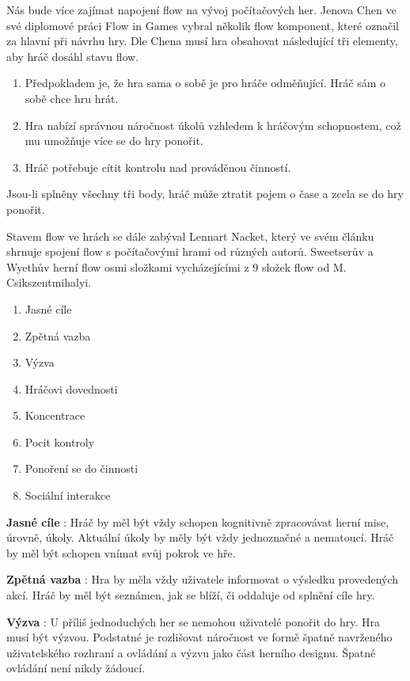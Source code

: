 Nás bude více zajímat napojení flow na vývoj počítačových her. Jenova Chen ve své diplomové práci Flow in Games\cite{thesisflow} vybral několik flow komponent, které označil za hlavní při návrhu hry. Dle Chena musí hra obsahovat následující tři elementy, aby hráč dosáhl stavu flow.

\begin{enumerate}
	\item Předpokladem je, že hra sama o sobě je pro hráče odměňující. Hráč sám o sobě chce hru hrát.
	\item Hra nabízí správnou náročnost úkolů vzhledem k hráčovým schopnostem, což mu umožňuje více se do hry ponořit.
	\item Hráč potřebuje cítit kontrolu nad prováděnou činností.
\end{enumerate}

Jsou-li splněny všechny tři body, hráč může ztratit pojem o čase a zcela se do hry ponořit.

Stavem flow ve hrách se dále zabýval Lennart Nacket, který ve svém článku\cite{FlowAll} shrnuje spojení flow s počítačovými hrami od různých autorů. Sweetserův a Wyethův herní flow osmi složkami vycházejícími z 9 složek flow od M. Csikszentmihalyi.

\begin{enumerate}
  \item Jasné cíle
	\item Zpětná vazba
	\item Výzva
	\item Hráčovi dovednosti
	\item Koncentrace
	\item Pocit kontroly
	\item Ponoření se do činnosti
	\item Sociální interakce
\end{enumerate}

\textbf{Jasné cíle} : 
Hráč by měl být vždy schopen kognitivně zpracovávat herní mise, úrovně, úkoly. Aktuální úkoly by měly být vždy jednoznačné a nematoucí. Hráč by měl být schopen vnímat svůj pokrok ve hře.

\textbf{Zpětná vazba} : 
Hra by měla vždy uživatele informovat o výsledku provedených akcí. Hráč by měl být seznámen, jak se blíží, či oddaluje od splnění cíle hry.

\textbf{Výzva} : 
U příliš jednoduchých her se nemohou uživatelé ponořit do hry. Hra musí být výzvou. Podstatné je rozlišovat náročnost ve formě špatně navrženého uživatelského rozhraní a ovládání a výzvu jako část herního designu. Špatné ovládání není nikdy žádoucí.

